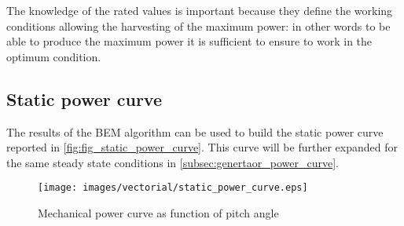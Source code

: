 The knowledge of the rated values is important because they define the working conditions allowing the harvesting of the maximum power: in other words to be able to produce the maximum power it is sufficient to ensure to work in the optimum condition.

\subsection{Static power curve}\label{subsec:static_power_curve}
The results of the \acrshort{BEM} algorithm can be used to build the static power curve reported in \autoref{fig:fig_static_power_curve}. This curve will be further expanded for the same steady state conditions in \autoref{subsec:genertaor_power_curve}.
\begin{figure}
  \centering
  \texttt{[image: images/vectorial/static\_power\_curve.eps]}
  \caption{Mechanical power curve as function of pitch angle}
  \label{fig:fig_static_power_curve}
\end{figure}


